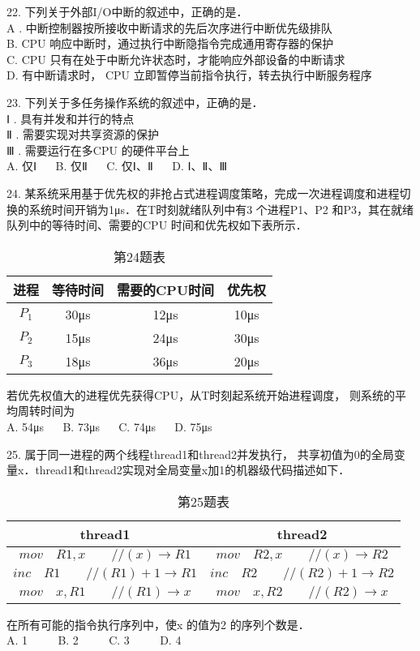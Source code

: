 22. 下列关于外部I/O中断的叙述中，正确的是． \\
A . 中断控制器按所接收中断请求的先后次序进行中断优先级排队 \\
B. CPU 响应中断时，通过执行中断隐指令完成通用寄存器的保护 \\
C. CPU 只有在处于中断允许状态时，才能响应外部设备的中断请求 \\
D. 有中断请求时， CPU 立即暂停当前指令执行，转去执行中断服务程序

23. 下列关于多任务操作系统的叙述中，正确的是． \\
Ⅰ . 具有并发和并行的特点 \\
Ⅱ . 需要实现对共享资源的保护 \\
Ⅲ . 需要运行在多CPU 的硬件平台上 \\
A. 仅Ⅰ $\quad$ B. 仅Ⅱ $\quad$ C. 仅Ⅰ、Ⅱ $\quad$ D. Ⅰ、Ⅱ、Ⅲ

24. 某系统采用基于优先权的非抢占式进程调度策略，完成一次进程调度和进程切换的系统时间开销为1μs．在T时刻就绪队列中有3 个进程P1、P2 和P3，其在就绪队列中的等待时间、需要的CPU 时间和优先权如下表所示．
\begin{table}[ht]
\centering
\caption{第24题表}\label{CSN18_tab1}
\begin{tabular}{|c|c|c|c|}
\hline
进程 & 等待时间 & 需要的CPU时间 & 优先权 \\
\hline
$P_1$ & 30μs & 12μs & 10μs \\
\hline
$P_2$ & 15μs & 24μs & 30μs \\
\hline
$P_3$ & 18μs & 36μs & 20μs \\
\hline
\end{tabular}
\end{table}
若优先权值大的进程优先获得CPU，从T时刻起系统开始进程调度， 则系统的平均周转时间为 \\
A. 54μs $\quad$ B. 73μs $\quad$ C. 74μs $\quad$ D. 75μs

25. 属于同一进程的两个线程thread1和thread2并发执行， 共享初值为0的全局变量x．thread1和thread2实现对全局变量x加1的机器级代码描述如下． \\
\begin{table}[ht]
\centering
\caption{第25题表}\label{CSN18_tab2}
\begin{tabular}{|c|c|}
\hline
thread1 & thread2 \\
\hline
$mov \quad R1,x \qquad // (x) \rightarrow R1$ & $mov \quad R2, x \qquad // (x) \rightarrow R2$ \\
\hline
$inc \quad R1 \qquad // (R1)+1 \rightarrow R1$ & $inc \quad R2 \qquad // (R2)+1 \rightarrow R2$ \\
\hline
$mov \quad x,R1 \qquad // (R1) \rightarrow x$ & $mov \quad x,R2 \qquad // (R2) \rightarrow x$ \\
\hline
\end{tabular}
\end{table}
在所有可能的指令执行序列中，使x 的值为2 的序列个数是． \\
A. 1 $\qquad$ B. 2 $\qquad$ C. 3 $\qquad$ D. 4

